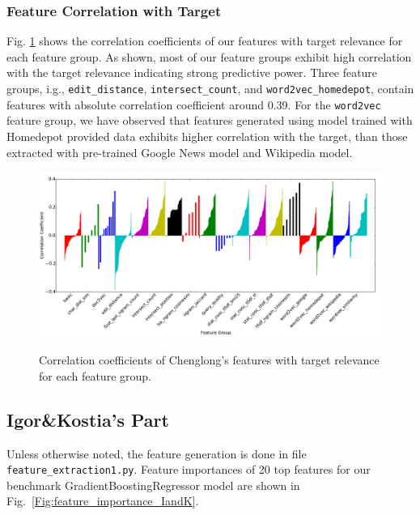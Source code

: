 \documentclass[12pt]{article}
\begin{document}
\subsubsection{Feature Correlation with Target}
Fig. \ref{Fig:feature_corr_Chenglong} shows the correlation coefficients of our features with target relevance for each feature group. As shown, most of our feature groups exhibit high correlation with the target relevance indicating strong predictive power. Three feature groups, i.g., \texttt{edit\_distance}, \texttt{intersect\_count}, and \texttt{word2vec\_homedepot}, contain features with absolute correlation coefficient around 0.39. For the \texttt{word2vec} feature group, we have observed that features generated using model trained with Homedepot provided data exhibits higher correlation with the target, than those extracted with pre-trained Google News model and Wikipedia model.

\begin{figure}[t]
  \centering
  \includegraphics[width=1\textwidth]{../Fig/feature_corr_Chenglong.pdf}\\
  \caption{Correlation coefficients of Chenglong's features with target relevance for each feature group.}
  \label{Fig:feature_corr_Chenglong}
\end{figure}

\subsection{Igor\&Kostia's Part}
\label{subsec:Features_IandK}
Unless otherwise noted, the feature generation is done in file \texttt{feature\_extraction1.py}. Feature importances of 20 top features for our benchmark GradientBoostingRegressor model are shown in Fig.\ \ref{Fig:feature_importance_IandK}.
\end{document}
